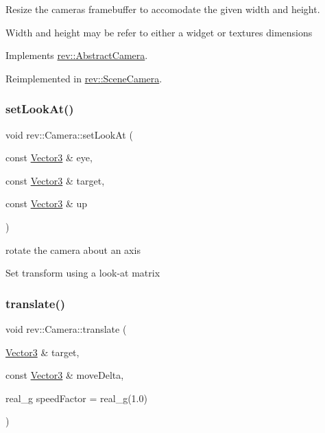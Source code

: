 Resize the camera\textquotesingle{}s framebuffer to accomodate the given width and height. 

Width and height may be refer to either a widget or texture\textquotesingle{}s dimensions 

Implements \mbox{\hyperlink{classrev_1_1_abstract_camera_aaa1843c3653515e93eecc2a255d32987}{rev\+::\+Abstract\+Camera}}.



Reimplemented in \mbox{\hyperlink{classrev_1_1_scene_camera_a2cc00ef51c784af2cdf9fe9308177c1a}{rev\+::\+Scene\+Camera}}.

\mbox{\label{classrev_1_1_camera_a64f10bf208e61d9750caa1aecca5a4fa}} 
\subsubsection{\texorpdfstring{setLookAt()}{setLookAt()}}
{\footnotesize\ttfamily void rev\+::\+Camera\+::set\+Look\+At (\begin{DoxyParamCaption}\item[{const \mbox{\hyperlink{classrev_1_1_vector}{Vector3}} \&}]{eye,  }\item[{const \mbox{\hyperlink{classrev_1_1_vector}{Vector3}} \&}]{target,  }\item[{const \mbox{\hyperlink{classrev_1_1_vector}{Vector3}} \&}]{up }\end{DoxyParamCaption})}



rotate the camera about an axis 

Set transform using a look-\/at matrix \mbox{\label{classrev_1_1_camera_a82e1f7d37a5a13ebd824c296979ac736}} 
\subsubsection{\texorpdfstring{translate()}{translate()}}
{\footnotesize\ttfamily void rev\+::\+Camera\+::translate (\begin{DoxyParamCaption}\item[{\mbox{\hyperlink{classrev_1_1_vector}{Vector3}} \&}]{target,  }\item[{const \mbox{\hyperlink{classrev_1_1_vector}{Vector3}} \&}]{move\+Delta,  }\item[{real\+\_\+g}]{speed\+Factor = {\ttfamily real\+\_\+g(1.0)} }\end{DoxyParamCaption})}



